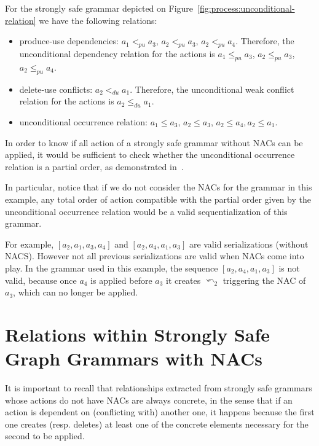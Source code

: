 \begin{example}  For the strongly safe grammar depicted on Figure~\ref{fig:process:unconditional-relation} we have the following relations: 

\begin{itemize}
  \item produce-use dependencies: $a_1 <_{pu} a_3$, $a_2 <_{pu} a_3$, $a_2 <_{pu} a_4$. Therefore, the unconditional dependency relation for the actions is $a_1 \leq_{pu} a_3$, $a_2 \leq_{pu} a_3$, $a_2 \leq_{pu} a_4$. 
  \item delete-use conflicts: $a_2 <_{du} a_1$. Therefore, the unconditional weak conflict relation for the actions is $a_2 \leq_{du} a_1$.
  \item unconditional occurrence relation: $a_1 \leq a_3$, $a_2 \leq a_3$, $a_2 \leq a_4, a_2 \leq a_1$.
\end{itemize}

  In order to know if all action of a strongly safe grammar without NACs can be applied, it would be sufficient to check whether the unconditional occurrence relation is a partial order, as demonstrated in~\cite{Ribeiro1996}.

In particular, notice that if we do not consider the NACs for the grammar in this example, any total order of action compatible with the partial order given by the unconditional occurrence relation would be a valid sequentialization of this grammar. 

  For example, $[a_2, a_1, a_3, a_4]$ and $[a_2, a_4, a_1, a_3]$ are valid serializations (without NACS). However not all previous serializations are valid when NACs come into play. In the grammar used in this example, the sequence $[a_2, a_4, a_1, a_3]$ is not valid, because once $a_4$ is applied before $a_3$ it creates $\curvearrowleft_2$ triggering the NAC of $a_3$, which can no longer be applied.

\end{example}

\section{Relations within Strongly Safe Graph Grammars with NACs}

It is important to recall that relationships extracted from strongly safe grammars whose actions do not have NACs are always concrete, in the sense that if an action is dependent on (conflicting with) another one, it happens because the first one creates (resp. deletes) at least one of the concrete elements necessary for the second to be applied.

